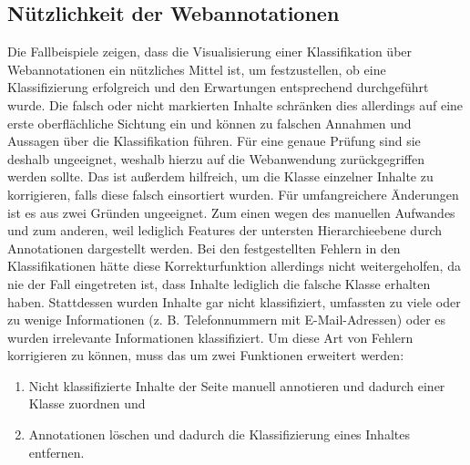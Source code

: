 \subsection{Nützlichkeit der Webannotationen}
    Die Fallbeispiele zeigen, dass die Visualisierung einer Klassifikation
    über Webannotationen ein nützliches Mittel ist, um festzustellen,
    ob eine Klassifizierung erfolgreich und den Erwartungen entsprechend durchgeführt wurde.
    Die falsch oder nicht markierten Inhalte schränken dies allerdings
    auf eine erste oberflächliche Sichtung ein
    und können zu falschen Annahmen und Aussagen über die Klassifikation führen.
    Für eine genaue Prüfung sind sie deshalb ungeeignet,
    weshalb hierzu auf die Webanwendung zurückgegriffen werden sollte.
    Das {\annotatorPlugin} ist außerdem hilfreich,
    um die Klasse einzelner Inhalte zu korrigieren,
    falls diese falsch einsortiert wurden.
    Für umfangreichere Änderungen ist es aus zwei Gründen ungeeignet.
    Zum einen wegen des manuellen Aufwandes
    und zum anderen, weil lediglich Features der untersten Hierarchieebene
    durch Annotationen dargestellt werden.
    Bei den festgestellten Fehlern in den Klassifikationen hätte diese
    Korrekturfunktion allerdings nicht weitergeholfen,
    da nie der Fall eingetreten ist, dass Inhalte lediglich die falsche Klasse erhalten haben.
    Stattdessen wurden Inhalte gar nicht klassifiziert,
    umfassten zu viele oder zu wenige Informationen
    (z. B. Telefonnummern mit E-Mail-Adressen)
    oder es wurden irrelevante Informationen klassifiziert.
    Um diese Art von Fehlern korrigieren zu können,
    muss das {\annotatorPlugin} um zwei Funktionen erweitert werden:

    \begin{enumerate}
        \item Nicht klassifizierte Inhalte der Seite manuell annotieren und dadurch einer Klasse zuordnen und
        \item Annotationen löschen und dadurch die Klassifizierung eines Inhaltes entfernen.
    \end{enumerate}